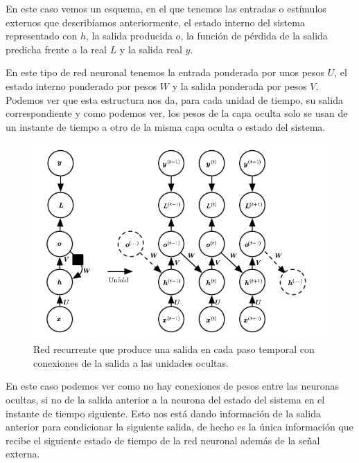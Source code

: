 En este caso vemos un esquema, en el que tenemos las entradas o estímulos externos que describíamos anteriormente, el estado interno del sistema representado con $h$, la salida producida $o$, la función de pérdida de la salida predicha frente a la real $L$ y la salida real $y$.

En este tipo de red neuronal tenemos la entrada ponderada por unos pesos $U$, el estado interno ponderado por pesos $W$ y la salida ponderada por pesos $V$. Podemos ver que esta estructura nos da, para cada unidad de tiempo, su salida correspondiente y  como podemos ver, los pesos de la capa oculta solo se usan de un instante de tiempo a otro de la misma capa oculta o estado del sistema.

\begin{figure}[H]
	\centering
	\includegraphics[scale=0.5]{imagenes/rnn2.png}
	\caption{Red recurrente que produce una salida en cada paso temporal con conexiones de la salida a las unidades ocultas.}
	\label{img:red-recurrente2}
\end{figure}

En este caso podemos ver como no hay conexiones de pesos entre las neuronas ocultas, si no de la salida anterior a la neurona del estado del sistema en el instante de tiempo siguiente. Esto nos está dando información de la salida anterior para condicionar la siguiente salida, de hecho es la única información que recibe el siguiente estado de tiempo de la red neuronal además de la señal externa.

